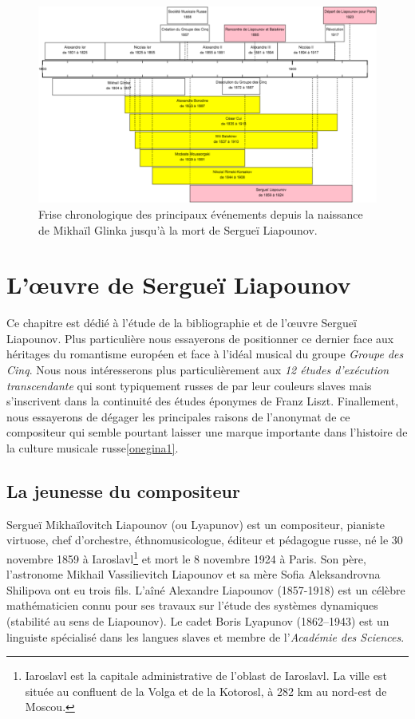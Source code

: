 \begin{figure}[!ht]
  \begin{bigcenter}
    \includegraphics[width=15.5cm, keepaspectratio]{frise.png}
  \end{bigcenter}
  \caption{\label{frise}Frise chronologique des principaux événements depuis la naissance de Mikhaïl Glinka jusqu'à la mort de Sergueï Liapounov.}
\end{figure}


\chapter{L'œuvre de Sergueï Liapounov}

Ce chapitre est dédié à l'étude de la bibliographie et de l'œuvre Sergueï Liapounov. Plus particulière nous essayerons de positionner ce dernier face aux héritages du romantisme européen et face à l'idéal musical du groupe \emph{Groupe des Cinq}. Nous nous intéresserons plus particulièrement aux \emph{12 études d'exécution transcendante} qui sont typiquement russes de par leur couleurs slaves mais s'inscrivent dans la continuité des études éponymes de Franz Liszt. Finallement, nous essayerons de dégager les principales raisons de l'anonymat de ce compositeur qui semble pourtant laisser une marque importante dans l'histoire de la culture musicale russe\ref{onegina1}.

\section{La jeunesse du compositeur}

Sergueï Mikhaïlovitch Liapounov (ou Lyapunov) est un compositeur, pianiste virtuose, chef d'orchestre, éthnomusicologue, éditeur et pédagogue russe, né le 30 novembre 1859 à Iaroslavl\footnote{Iaroslavl est la capitale administrative de l'oblast de Iaroslavl. La ville est située au confluent de la Volga et de la Kotorosl, à 282 km au nord-est de Moscou.} et mort le 8 novembre 1924 à Paris. Son père, l'astronome Mikhail Vassilievitch Liapounov et sa mère Sofia Aleksandrovna Shilipova ont eu trois fils. L'aîné Alexandre Liapounov (1857-1918) est un célèbre mathématicien connu pour ses travaux sur l'étude des systèmes dynamiques (stabilité au sens de Liapounov). Le cadet Boris Lyapunov (1862–1943) est un linguiste spécialisé dans les langues slaves et membre de l'\emph{Académie des Sciences}.

